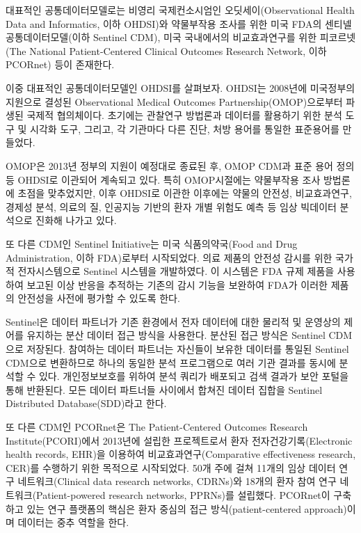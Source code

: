 \documentclass[]{book}
\begin{document}
대표적인 공통데이터모델로는 비영리 국제컨소시엄인 오딧세이(Observational Health Data and Informatics, 이하 OHDSI)와 약물부작용 조사를 위한 미국 FDA의 센티넬 공통데이터모델(이하 Sentinel CDM), 미국 국내에서의 비교효과연구를 위한 피코르넷(The National Patient-Centered Clinical Outcomes Research Network, 이하 PCORnet) 등이 존재한다.

이중 대표적인 공통데이터모델인 OHDSI를 살펴보자. OHDSI는 2008년에 미국정부의 지원으로 결성된 Observational Medical Outcomes Partnership(OMOP)으로부터 파생된 국제적 협의체이다. 초기에는 관찰연구 방법론과 데이터를 활용하기 위한 분석 도구 및 시각화 도구, 그리고, 각 기관마다 다른 진단, 처방 용어를 통일한 표준용어를 만들었다.

OMOP은 2013년 정부의 지원이 예정대로 종료된 후, OMOP CDM과 표준 용어 정의 등 OHDSI로 이관되어 계속되고 있다. 특히 OMOP시절에는 약물부작용 조사 방법론에 초점을 맞추었지만, 이후 OHDSI로 이관한 이후에는 약물의 안전성, 비교효과연구, 경제성 분석, 의료의 질, 인공지능 기반의 환자 개별 위험도 예측 등 임상 빅데이터 분석으로 진화해 나가고 있다.

또 다른 CDM인 Sentinel Initiative는 미국 식품의약국(Food and Drug Administration, 이하 FDA)로부터 시작되었다. 의료 제품의 안전성 감시를 위한 국가적 전자시스템으로 Sentinel 시스템을 개발하였다. 이 시스템은 FDA 규제 제품을 사용하여 보고된 이상 반응을 추적하는 기존의 감시 기능을 보완하여 FDA가 이러한 제품의 안전성을 사전에 평가할 수 있도록 한다.

Sentinel은 데이터 파트너가 기존 환경에서 전자 데이터에 대한 물리적 및 운영상의 제어를 유지하는 분산 데이터 접근 방식을 사용한다. 분산된 접근 방식은 Sentinel CDM으로 저장된다. 참여하는 데이터 파트너는 자신들이 보유한 데이터를 통일된 Sentinel CDM으로 변환하므로 하나의 동일한 분석 프로그램으로 여러 기관 결과를 동시에 분석할 수 있다. 개인정보보호를 위하여 분석 쿼리가 배포되고 검색 결과가 보안 포털을 통해 반환된다. 모든 데이터 파트너들 사이에서 합쳐진 데이터 집합을 Sentinel Distributed Database(SDD)라고 한다.

또 다른 CDM인 PCORnet은 The Patient-Centered Outcomes Research Institute(PCORI)에서 2013년에 설립한 프로젝트로서 환자 전자건강기록(Electronic health records, EHR)을 이용하여 비교효과연구(Comparative effectiveness research, CER)를 수행하기 위한 목적으로 시작되었다. 50개 주에 걸쳐 11개의 임상 데이터 연구 네트워크(Clinical data research networks, CDRNs)와 18개의 환자 참여 연구 네트워크(Patient-powered research networks, PPRNs)를 설립했다. PCORnet이 구축하고 있는 연구 플랫폼의 핵심은 환자 중심의 접근 방식(patient-centered approach)이며 데이터는 중추 역할을 한다.
\end{document}
